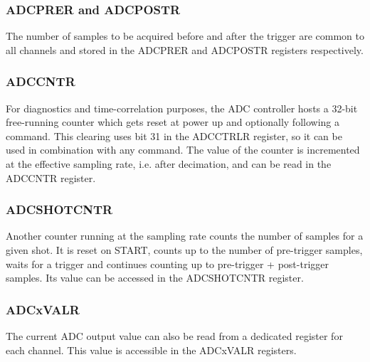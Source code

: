 \documentclass{article}
\begin{document}
\subsubsection{ADCPRER and ADCPOSTR}
The number of samples to be acquired before and after the trigger are common to all channels and stored in the ADCPRER and ADCPOSTR registers respectively.

\subsubsection{ADCCNTR}
\label{sssec:adccntr}
For diagnostics and time-correlation purposes, the ADC controller hosts a 32-bit free-running counter which gets reset at power up and optionally following a command. This clearing uses bit 31 in the ADCCTRLR register, so it can be used in combination with any command. The value of the counter is incremented at the effective sampling rate, i.e. after decimation, and can be read in the ADCCNTR register.   

\subsubsection{ADCSHOTCNTR}
Another counter running at the sampling rate counts the number of samples for a given shot. It is reset on START, counts up to the number of pre-trigger samples, waits for a trigger and continues counting up to pre-trigger + post-trigger samples. Its value can be accessed in the ADCSHOTCNTR register.

\subsubsection{ADCxVALR}
The current ADC output value can also be read from a dedicated register for each channel. This value is accessible in the ADCxVALR registers.
\end{document}
